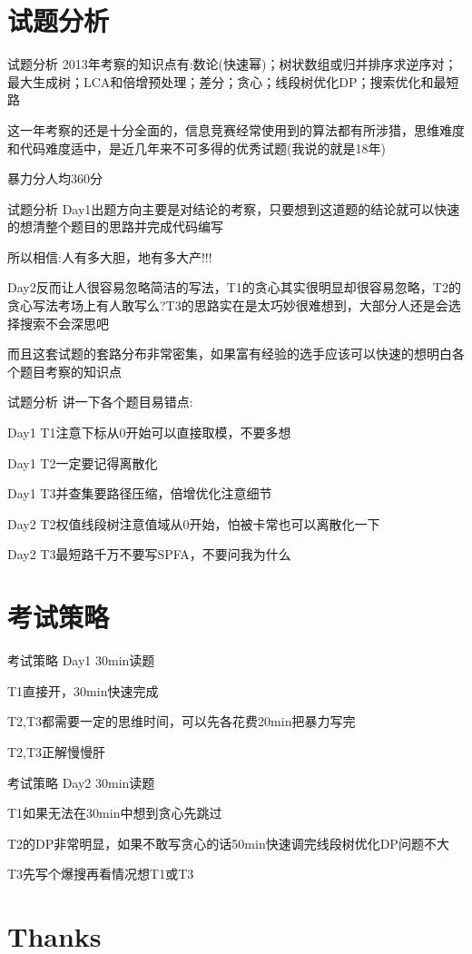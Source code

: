 \documentclass[10pt]{beamer}
\begin{document}
  \section{试题分析}

  \begin{frame}{试题分析} 
     2013年考察的知识点有:数论(快速幂)；树状数组或归并排序求逆序对；最大生成树；LCA和倍增预处理；差分；贪心；线段树优化DP；搜索优化和最短路

     这一年考察的还是十分全面的，信息竞赛经常使用到的算法都有所涉猎，思维难度和代码难度适中，是近几年来不可多得的优秀试题(我说的就是18年)

     暴力分人均360分
  \end{frame}

  \begin{frame}{试题分析} 
     Day1出题方向主要是对结论的考察，只要想到这道题的结论就可以快速的想清整个题目的思路并完成代码编写
    
     所以相信:人有多大胆，地有多大产!!!

     Day2反而让人很容易忽略简洁的写法，T1的贪心其实很明显却很容易忽略，T2的贪心写法考场上有人敢写么?T3的思路实在是太巧妙很难想到，大部分人还是会选择搜索不会深思吧

     而且这套试题的套路分布非常密集，如果富有经验的选手应该可以快速的想明白各个题目考察的知识点
  \end{frame}

  \begin{frame}{试题分析}
     讲一下各个题目易错点:

     Day1 T1注意下标从0开始可以直接取模，不要多想

     Day1 T2一定要记得离散化

     Day1 T3并查集要路径压缩，倍增优化注意细节

     Day2 T2权值线段树注意值域从0开始，怕被卡常也可以离散化一下

     Day2 T3最短路千万不要写SPFA，不要问我为什么
  \end{frame}

  \section{考试策略}

  \begin{frame}{考试策略 Day1} 
     30min读题

     T1直接开，30min快速完成

     T2,T3都需要一定的思维时间，可以先各花费20min把暴力写完

     T2,T3正解慢慢肝
  \end{frame}

  \begin{frame}{考试策略 Day2} 
     30min读题

     T1如果无法在30min中想到贪心先跳过

     T2的DP非常明显，如果不敢写贪心的话50min快速调完线段树优化DP问题不大

     T3先写个爆搜再看情况想T1或T3
  \end{frame}

  \section{Thanks}
\end{document}
